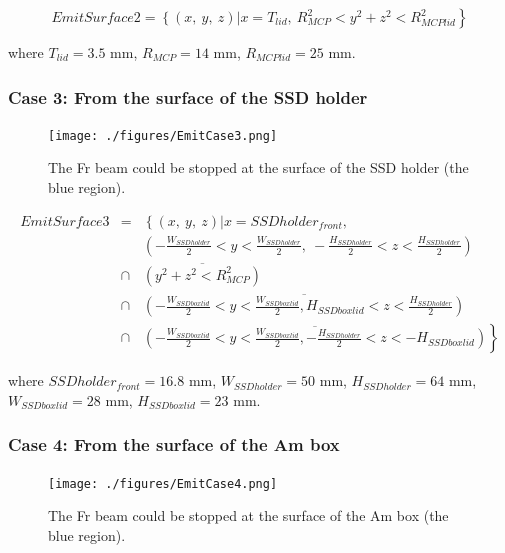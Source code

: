 \documentclass{article}
\begin{document}
$$
EmitSurface2 = \left\{ (x,~y,~z) \right| \left. x = T_{lid},~R_{MCP}^2 < y^2+z^2 < R_{MCPlid}^2 \right\}
$$

where $T_{lid} = 3.5$ mm, $R_{MCP} = 14$ mm, $R_{MCPlid} = 25$ mm.



\subsubsection{Case 3: From the surface of the SSD holder}

\begin{figure}[H]
  \begin{center}
    \texttt{[image: ./figures/EmitCase3.png]}
	  \caption{The Fr beam could be stopped at the surface of the SSD holder (the blue region).}
    \label{fig:EmitCase3}
  \end{center}
\end{figure}

\begin{eqnarray*}
	EmitSurface3 & = & \left\{ (x,~y,~z) \right| x = SSDholder_{front},\\
	& & \left( -\frac{W_{SSDholder}}{2} < y < \frac{W_{SSDholder}}{2},~-\frac{H_{SSDholder}}{2} < z < \frac{H_{SSDholder}}{2} \right) \\
	& \cap & \overline{\left( y^2+z^2 < R_{MCP}^2 \right)} \\
	& \cap & \overline{\left( -\frac{W_{SSDboxlid}}{2} < y < \frac{W_{SSDboxlid}}{2}, H_{SSDboxlid} < z < \frac{H_{SSDholder}}{2} \right)} \\
	& \cap & \left. \overline{\left( -\frac{W_{SSDboxlid}}{2} < y < \frac{W_{SSDboxlid}}{2}, -\frac{H_{SSDholder}}{2} < z < -H_{SSDboxlid} \right)} \right\}
\end{eqnarray*}

where $SSDholder_{front} = 16.8$ mm, $W_{SSDholder} = 50$ mm, $H_{SSDholder} = 64$ mm, $W_{SSDboxlid} = 28$ mm, $H_{SSDboxlid} = 23$ mm.



\subsubsection{Case 4: From the surface of the Am box}

\begin{figure}[H]
  \begin{center}
    \texttt{[image: ./figures/EmitCase4.png]}
	  \caption{The Fr beam could be stopped at the surface of the Am box (the blue region).}
    \label{fig:EmitCase4}
  \end{center}
\end{figure}
\end{document}
